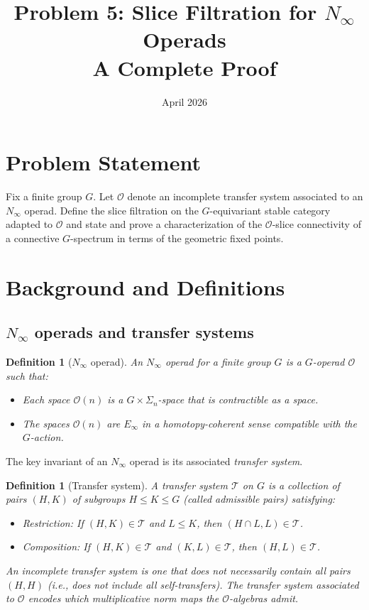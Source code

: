 \documentclass[12pt]{article}
\title{Problem 5: Slice Filtration for $N_\infty$ Operads\\
\large A Complete Proof}
\author{}
\date{April 2026}
\newtheorem{definition}[theorem]{Definition}
\begin{document}
\maketitle

\section{Problem Statement}

Fix a finite group $G$. Let $\mathcal{O}$ denote an incomplete transfer system associated to an $N_\infty$ operad. Define the slice filtration on the $G$-equivariant stable category adapted to $\mathcal{O}$ and state and prove a characterization of the $\mathcal{O}$-slice connectivity of a connective $G$-spectrum in terms of the geometric fixed points.

\section{Background and Definitions}

\subsection{$N_\infty$ operads and transfer systems}

\begin{definition}[$N_\infty$ operad]
An $N_\infty$ operad for a finite group $G$ is a $G$-operad $\mathcal{O}$ such that:
\begin{itemize}
\item Each space $\mathcal{O}(n)$ is a $G \times \Sigma_n$-space that is contractible as a space.
\item The spaces $\mathcal{O}(n)$ are $E_\infty$ in a homotopy-coherent sense compatible with the $G$-action.
\end{itemize}
\end{definition}

The key invariant of an $N_\infty$ operad is its associated \emph{transfer system}.

\begin{definition}[Transfer system]
A transfer system $\mathcal{T}$ on $G$ is a collection of pairs $(H, K)$ of subgroups $H \leq K \leq G$ (called admissible pairs) satisfying:
\begin{itemize}
\item[(T1)] Restriction: If $(H, K) \in \mathcal{T}$ and $L \leq K$, then $(H \cap L, L) \in \mathcal{T}$.
\item[(T2)] Composition: If $(H, K) \in \mathcal{T}$ and $(K, L) \in \mathcal{T}$, then $(H, L) \in \mathcal{T}$.
\end{itemize}
An \emph{incomplete} transfer system is one that does not necessarily contain all pairs $(H, H)$ (i.e., does not include all self-transfers). The transfer system associated to $\mathcal{O}$ encodes which multiplicative norm maps the $\mathcal{O}$-algebras admit.
\end{definition}
\end{document}

